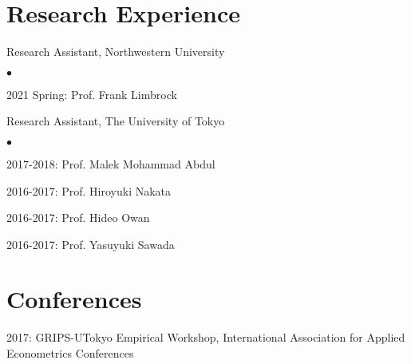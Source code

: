 \documentclass[margin,line]{res}
\newenvironment{list1}{
  \begin{list}{\ding{113}}{%
      \setlength{\itemsep}{.025in}
      \setlength{\parsep}{0in} \setlength{\parskip}{0in}
      \setlength{\topsep}{0in} \setlength{\partopsep}{0in}
      \setlength{\leftmargin}{0.17in}}}{\end{list}}
\newenvironment{list2}{
  \begin{list}{$\bullet$}{%
      \setlength{\itemsep}{0in}
      \setlength{\parsep}{0in} \setlength{\parskip}{0in}
      \setlength{\topsep}{0in} \setlength{\partopsep}{0in}
      \setlength{\leftmargin}{0.2in}}}{\end{list}}
\begin{document}
\begin{resume}
\section{Research Experience}
\begin{list1}
\item[] Research Assistant, Northwestern University
	\begin{list2}
		\item[] 2021 Spring: Prof. Frank Limbrock
	\end{list2}
\item[] Research Assistant, The University of Tokyo
	\begin{list2}
	        \item[] 2017-2018: Prof. Malek Mohammad Abdul
		\item[] 2016-2017: Prof. Hiroyuki Nakata
		\item[] 2016-2017: Prof. Hideo Owan
		\item[] 2016-2017: Prof. Yasuyuki Sawada
	\end{list2}
\end{list1}

\section{Conferences}
\begin{list1}
\item[] 2017: GRIPS-UTokyo Empirical Workshop, International Association for Applied Econometrics Conferences
\end{list1}

\pagebreak


\end{resume}
\end{document}
